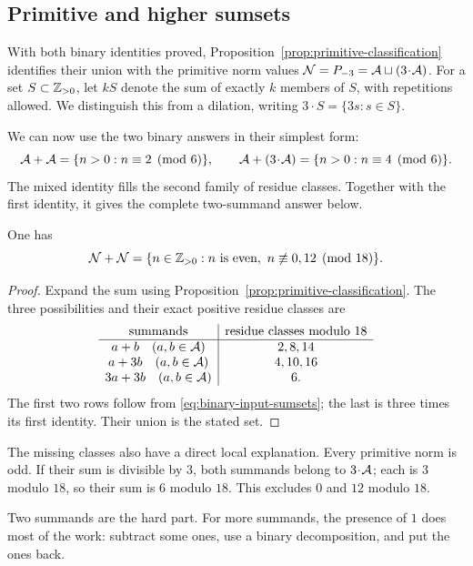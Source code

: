 \subsection{Primitive and higher sumsets}\label{sec:primitive-sumsets}
With both binary identities proved, Proposition~\ref{prop:primitive-classification}
identifies their union with the primitive norm values
$\NN=P_{-3}=\AA\sqcup(3\!\cdot\!\AA)$.
For a set $S\subset\Z_{>0}$, let $kS$ denote the sum of exactly $k$
members of $S$, with repetitions allowed. We distinguish this from a
dilation, writing $3\!\cdot\!S=\{3s:s\in S\}$.

We can now use the two binary answers in their simplest form:
\begin{equation}\label{eq:binary-input-sumsets}
\AA+\AA=\{n>0:n\equiv2\pmod6\},\qquad
\AA+(3\!\cdot\!\AA)=\{n>0:n\equiv4\pmod6\}.
\end{equation}
The mixed identity fills the second family of residue classes. Together
with the first identity, it gives the complete two-summand answer below.

\begin{proposition}\label{prop:primitive-binary}
One has
\[
\NN+\NN
=\{n\in\Z_{>0}:n\text{ is even},\ n\not\equiv0,12\pmod{18}\}.
\]
\end{proposition}
\begin{proof}
Expand the sum using Proposition~\ref{prop:primitive-classification}.
The three possibilities and their exact positive residue classes are
\[
\begin{array}{c|c}
\text{summands}&\text{residue classes modulo }18\\ \hline
 a+b\quad(a,b\in\AA)&2,8,14\\
 a+3b\quad(a,b\in\AA)&4,10,16\\
 3a+3b\quad(a,b\in\AA)&6.
\end{array}
\]
The first two rows follow from \eqref{eq:binary-input-sumsets}; the last
is three times its first identity. Their union is the stated set.
\end{proof}
The missing classes also have a direct local explanation. Every primitive
norm is odd. If their sum is divisible by $3$, both summands belong to
$3\!\cdot\!\AA$; each is $3$ modulo $18$, so their sum is $6$ modulo
$18$. This excludes $0$ and $12$ modulo $18$.

Two summands are the hard part. For more summands, the presence of $1$
does most of the work: subtract some ones, use a binary decomposition,
and put the ones back.


